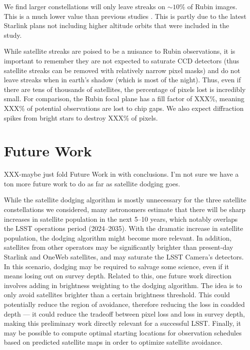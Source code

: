 \documentclass[linenumbers]{aastex631}
\begin{document}
We find larger constellations will only leave streaks on $\sim10$\% of Rubin images. This is a much lower value than previous studies \citep{lawrence22, tyson20}. This is partly due to the latest Starlink plans not including higher altitude orbits that were included in the \citet{tyson20} study. %

While satellite streaks are poised to be a nuisance to Rubin observations, it is important to remember they are not expected to saturate CCD detectors (thus satellite streaks can be removed with relatively narrow pixel masks) and do not leave streaks when in earth's shadow (which is most of the night). Thus, even if there are tens of thousands of satellites, the percentage of pixels lost is incredibly small. For comparison, the Rubin focal plane has a fill factor of XXX\%, meaning XXX\% of potential observations are lost to chip gaps. We also expect diffraction spikes from bright stars to destroy XXX\% of pixels. 

\section{Future Work}\label{future}

XXX-maybe just fold Future Work in with conclusions. I'm not sure we have a ton more future work to do as far as satellite dodging goes.

While the satellite dodging algorithm is mostly unnecessary for the three satellite constellations we considered, many astronomers estimate that there will be sharp increases in satellite population in the next 5–10 years, which notably overlaps the LSST operations period (2024–2035). With the dramatic increase in satellite population, the dodging algorithm might become more relevant. In addition, satellites from other operators may be significantly brighter than present-day Starlink and OneWeb satellites, and may saturate the LSST Camera’s detectors. In this scenario, dodging may be required to salvage some science, even if it means losing out on survey depth. Related to this, one future work direction involves adding in brightness weighting to the dodging algorithm. The idea is to only avoid satellites brighter than a certain brightness threshold. This could potentially reduce the region of avoidance, therefore reducing the loss in coadded depth — it could reduce the tradeoff between pixel loss and loss in survey depth, making this preliminary work directly relevant for a successful LSST. Finally, it may be possible to compute optimal starting locations for observation schedules based on predicted satellite maps in order to optimize satellite avoidance.
\end{document}

